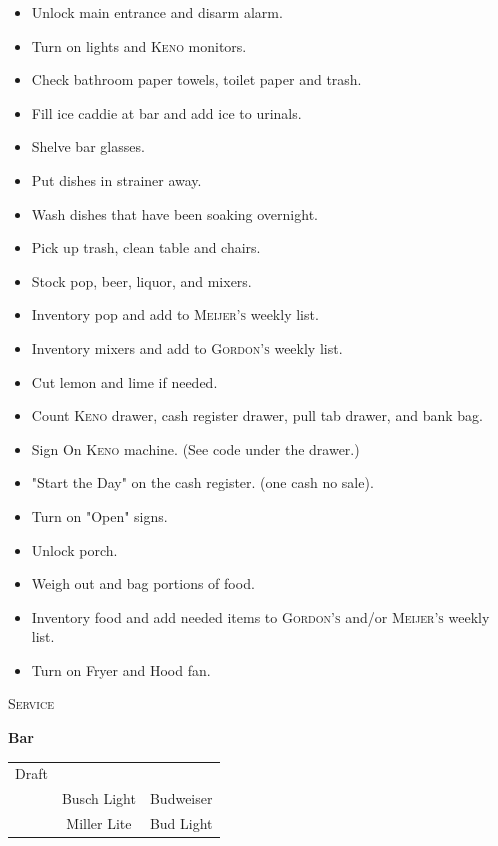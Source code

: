 \documentclass{tufte-handout}
\begin{document}
\begin{fullwidth}

\begin{itemize}
\item Unlock main entrance and disarm alarm.
\item Turn on lights and \textsc{Keno} monitors.
\item Check bathroom paper towels, toilet paper and trash.
\item Fill ice caddie at bar and add ice to urinals.
\item Shelve bar glasses.
\item Put dishes in strainer away.
\item Wash dishes that have been soaking overnight.
\item Pick up trash, clean table and chairs.
\item Stock pop, beer, liquor, and mixers.
\item Inventory pop and add to \textsc{Meijer's} weekly list.
\item Inventory mixers and add to \textsc{Gordon's} weekly list.
\item Cut lemon and lime if needed.
\item Count \textsc{Keno} drawer, cash register drawer, pull tab drawer, and bank bag.
\item Sign On \textsc{Keno} machine. (See code under the drawer.)
\item "Start the Day" on the cash register. (one cash no sale).
\item Turn on "Open" signs.
\item Unlock porch.
\item Weigh out and bag portions of food.
\item Inventory food and add needed items to \textsc{Gordon's} and/or \textsc{Meijer's} weekly list.
\item Turn on Fryer and Hood fan.
\end{itemize}
\end{fullwidth}

\begin{center}
\textsc{Service}
\end{center}

\textbf{Bar}

\begin{tabular}{ c c c}
\hline
Draft & & \\
& Busch Light & Budweiser \\
& Miller Lite  & Bud Light \\
\hline
\end{tabular}
\end{document}
